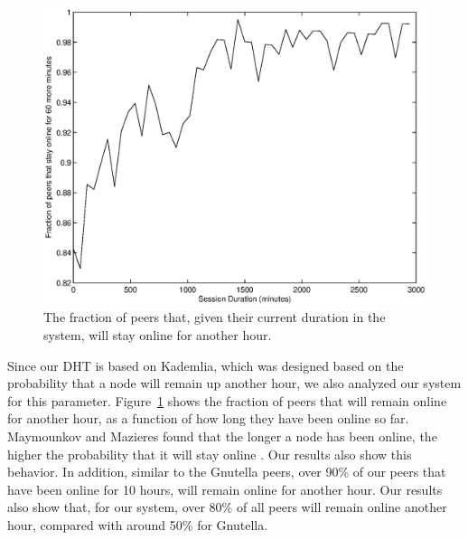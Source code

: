 \documentclass[conference]{IEEEtran}
\begin{document}
%

\begin{figure}
\centering
\includegraphics[width=0.80\columnwidth]{AptP2PDuration-online_1.eps}
\caption{The fraction of peers that, given their current duration in
the system, will stay online for another hour.}
\label{duration_online_1}
\end{figure}

Since our DHT is based on Kademlia, which was designed based on the
probability that a node will remain up another hour, we also
analyzed our system for this parameter.
Figure~\ref{duration_online_1} shows the fraction of peers that will
remain online for another hour, as a function of how long they have
been online so far. Maymounkov and Mazieres found that the longer a
node has been online, the higher the probability that it will stay
online \cite{kademlia}. Our results also show this behavior. In
addition, similar to the Gnutella peers, over 90\% of our peers that
have been online for 10 hours, will remain online for another hour.
Our results also show that, for our system, over 80\% of all peers
will remain online another hour, compared with around 50\% for
Gnutella.
\end{document}

